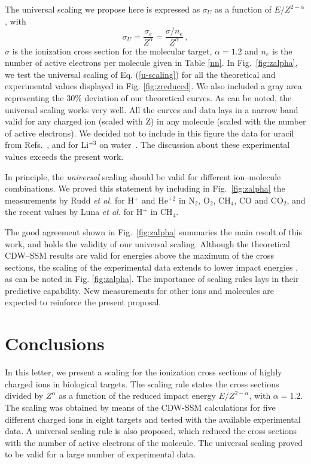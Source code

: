 \documentclass[10pt,showpacs,showkeys,twocolumn]{revtex4}
\begin{document}
The universal scaling we propose here is expressed as $\sigma_U$ as a 
function of $E/Z^{2-\alpha}$, with
 \begin{equation}
     \sigma_U=\frac{\sigma_e}{Z^{\alpha}}=\frac{\sigma/n_e}{Z^{\alpha}}\,,
     \label{u-scaling}
 \end{equation}
$\sigma$ is the ionization cross section for the molecular target, 
$\alpha=1.2$ and $n_e$ is the number of active electrons per molecule 
given in Table \ref{nn}. In Fig.~\ref{fig:zalpha}, we test the 
universal scaling of Eq. (\ref{u-scaling}) for all the theoretical and 
experimental values displayed in Fig. \ref{fig:zreduced}. We also 
included a gray area representing the 30\% deviation of our theoretical 
curves. As can be noted, the universal scaling works very well. All the 
curves and data lays in a narrow band valid for any charged ion (scaled 
with Z) in any molecule (scaled with the number of active electrons). 
We decided not to include in this figure the data for uracil from 
Refs.~\cite{agnihotri2012,agnihotri2013}, and for Li$^{+3}$ on 
water~\cite{Luna_Li_water}. The discussion about these experimental 
values exceeds the present work. %

In principle, the \textit{universal} scaling should be valid for different ion--molecule combinations. 
We proved this statement by including in Fig.~\ref{fig:zalpha} the measurements by Rudd \textit{et al.} \cite{Rudd85,Rudd1983} for H$^{+}$ and He$^{+2}$ in N$_2$, O$_2$, CH$_4$, CO and CO$_2$, and the recent values by Luna \textit{et al.} \cite{Luna2019} for H$^{+}$ in CH$_4$. 

The good agreement shown in Fig.~\ref{fig:zalpha} summaries the main result of this work, and holds the validity of our universal scaling. Although the theoretical CDW--SSM results  %
are valid for energies above the maximum of the cross sections, the scaling of the experimental data extends to lower impact energies%
, as can be noted in Fig. \ref{fig:zalpha}.
The importance of scaling rules lays in their predictive capability. New measurements for other ions and molecules are expected to reinforce the present proposal. 

\section{Conclusions}
In this letter, we present a scaling for the ionization cross sections of highly charged ions in biological targets. The scaling rule states the cross sections divided by $Z^{\alpha}$ as a function of the reduced impact energy $E/Z^{2-\alpha}$, with $\alpha=1.2$. The scaling was obtained by means of the CDW-SSM calculations for five different charged ions in eight targets and tested with the available experimental data. A universal scaling rule  is also proposed, which reduced the cross sections with the number of active electrons of the molecule. The universal scaling proved to be valid for a large number of experimental data.
\end{document}
